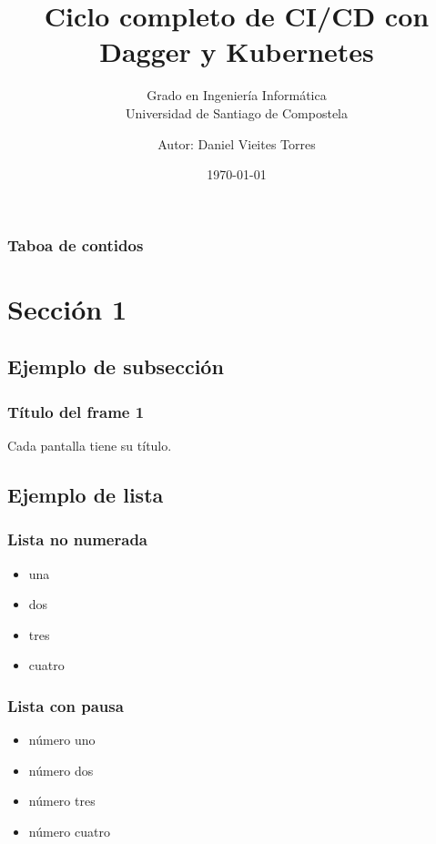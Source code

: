 \documentclass{beamer}
\begin{document}
\title{Ciclo completo de CI/CD con Dagger y Kubernetes}
\subtitle{Grado en Ingeniería Informática \\
    Universidad de Santiago de Compostela}
\author{Autor: Daniel Vieites Torres}
\date{\today}

\begin{frame}
    \titlepage
\end{frame}

\begin{frame}
    \frametitle{Taboa de contidos}\tableofcontents
\end{frame}

\section{Sección 1}
\subsection{Ejemplo de subsección}
\begin{frame}
    \frametitle{Título del frame 1}
    Cada pantalla tiene su título.
\end{frame}

\subsection{Ejemplo de lista}

\begin{frame}
    \frametitle{Lista no numerada}
    \begin{itemize}
        \item una
        \item dos
        \item tres
        \item cuatro
    \end{itemize}
\end{frame}

\begin{frame}
    \frametitle{Lista con pausa}
    \begin{itemize}
        \item número uno \pause
        \item número dos \pause
        \item número tres \pause
        \item número cuatro
    \end{itemize}
\end{frame}
\end{document}
